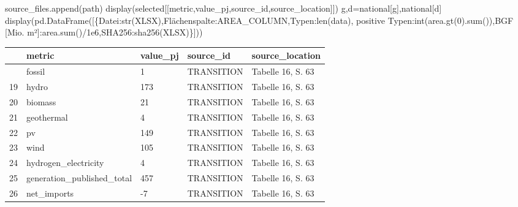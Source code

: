 \documentclass[
  ngerman,
  a4paper,
  DIV=11]{scrreprt}
\newenvironment{Shaded}{\begin{snugshade}}{\end{snugshade}}
\newcommand{\BuiltInTok}[1]{\textcolor[rgb]{0.00,0.23,0.31}{#1}}
\newcommand{\DecValTok}[1]{\textcolor[rgb]{0.68,0.00,0.00}{#1}}
\newcommand{\FloatTok}[1]{\textcolor[rgb]{0.68,0.00,0.00}{#1}}
\newcommand{\NormalTok}[1]{\textcolor[rgb]{0.00,0.23,0.31}{#1}}
\newcommand{\OperatorTok}[1]{\textcolor[rgb]{0.37,0.37,0.37}{#1}}
\newcommand{\StringTok}[1]{\textcolor[rgb]{0.13,0.47,0.30}{#1}}
\newcounter{none} %
\begin{document}
\begin{Shaded}
\begin{Highlighting}[]
\NormalTok{    source\_files.append(path)}
\NormalTok{    display(selected[[}\StringTok{\textquotesingle{}metric\textquotesingle{}}\NormalTok{,}\StringTok{\textquotesingle{}value\_pj\textquotesingle{}}\NormalTok{,}\StringTok{\textquotesingle{}source\_id\textquotesingle{}}\NormalTok{,}\StringTok{\textquotesingle{}source\_location\textquotesingle{}}\NormalTok{]])}
\NormalTok{g,d}\OperatorTok{=}\NormalTok{national[}\StringTok{\textquotesingle{}g\textquotesingle{}}\NormalTok{],national[}\StringTok{\textquotesingle{}d\textquotesingle{}}\NormalTok{]}
\NormalTok{display(pd.DataFrame([\{}\StringTok{\textquotesingle{}Datei\textquotesingle{}}\NormalTok{:}\BuiltInTok{str}\NormalTok{(XLSX),}\StringTok{\textquotesingle{}Flächenspalte\textquotesingle{}}\NormalTok{:AREA\_COLUMN,}\StringTok{\textquotesingle{}Typen\textquotesingle{}}\NormalTok{:}\BuiltInTok{len}\NormalTok{(data),}
 \StringTok{\textquotesingle{}positive Typen\textquotesingle{}}\NormalTok{:}\BuiltInTok{int}\NormalTok{(area.gt(}\DecValTok{0}\NormalTok{).}\BuiltInTok{sum}\NormalTok{()),}\StringTok{\textquotesingle{}BGF [Mio. m²]\textquotesingle{}}\NormalTok{:area.}\BuiltInTok{sum}\NormalTok{()}\OperatorTok{/}\FloatTok{1e6}\NormalTok{,}\StringTok{\textquotesingle{}SHA256\textquotesingle{}}\NormalTok{:sha256(XLSX)\}]))}
\end{Highlighting}
\end{Shaded}

{\def\LTcaptype{none} %
\begin{longtable}[]{@{}lllll@{}}
\toprule\noalign{}
& metric & value\_pj & source\_id & source\_location \\
\midrule\noalign{}
\endhead
\bottomrule\noalign{}
\endlastfoot
18 & fossil & 1 & TRANSITION & Tabelle 16, S. 63 \\
19 & hydro & 173 & TRANSITION & Tabelle 16, S. 63 \\
20 & biomass & 21 & TRANSITION & Tabelle 16, S. 63 \\
21 & geothermal & 4 & TRANSITION & Tabelle 16, S. 63 \\
22 & pv & 149 & TRANSITION & Tabelle 16, S. 63 \\
23 & wind & 105 & TRANSITION & Tabelle 16, S. 63 \\
24 & hydrogen\_electricity & 4 & TRANSITION & Tabelle 16, S. 63 \\
25 & generation\_published\_total & 457 & TRANSITION & Tabelle 16, S.
63 \\
26 & net\_imports & -7 & TRANSITION & Tabelle 16, S. 63 \\
\end{longtable}
}
\end{document}
